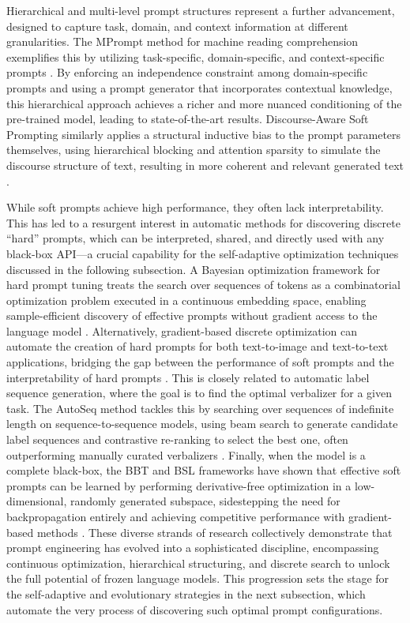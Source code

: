 \documentclass[11pt]{article}
\begin{document}
Hierarchical and multi-level prompt structures represent a further advancement, designed to capture task, domain, and context information at different granularities. The MPrompt method for machine reading comprehension exemplifies this by utilizing task-specific, domain-specific, and context-specific prompts \cite{ref162}. By enforcing an independence constraint among domain-specific prompts and using a prompt generator that incorporates contextual knowledge, this hierarchical approach achieves a richer and more nuanced conditioning of the pre-trained model, leading to state-of-the-art results. Discourse-Aware Soft Prompting similarly applies a structural inductive bias to the prompt parameters themselves, using hierarchical blocking and attention sparsity to simulate the discourse structure of text, resulting in more coherent and relevant generated text \cite{ref163}.

While soft prompts achieve high performance, they often lack interpretability. This has led to a resurgent interest in automatic methods for discovering discrete ``hard'' prompts, which can be interpreted, shared, and directly used with any black-box API---a crucial capability for the self-adaptive optimization techniques discussed in the following subsection. A Bayesian optimization framework for hard prompt tuning treats the search over sequences of tokens as a combinatorial optimization problem executed in a continuous embedding space, enabling sample-efficient discovery of effective prompts without gradient access to the language model \cite{ref164}. Alternatively, gradient-based discrete optimization can automate the creation of hard prompts for both text-to-image and text-to-text applications, bridging the gap between the performance of soft prompts and the interpretability of hard prompts \cite{ref165}. This is closely related to automatic label sequence generation, where the goal is to find the optimal verbalizer for a given task. The AutoSeq method tackles this by searching over sequences of indefinite length on sequence-to-sequence models, using beam search to generate candidate label sequences and contrastive re-ranking to select the best one, often outperforming manually curated verbalizers \cite{ref166}. Finally, when the model is a complete black-box, the BBT and BSL frameworks have shown that effective soft prompts can be learned by performing derivative-free optimization in a low-dimensional, randomly generated subspace, sidestepping the need for backpropagation entirely and achieving competitive performance with gradient-based methods \cite{ref167,ref168}. These diverse strands of research collectively demonstrate that prompt engineering has evolved into a sophisticated discipline, encompassing continuous optimization, hierarchical structuring, and discrete search to unlock the full potential of frozen language models. This progression sets the stage for the self-adaptive and evolutionary strategies in the next subsection, which automate the very process of discovering such optimal prompt configurations.
\end{document}
